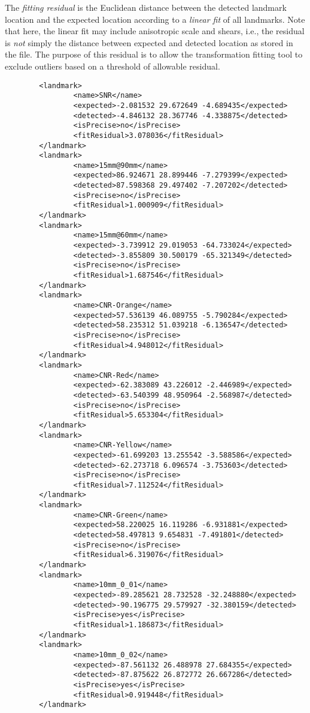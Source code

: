 \documentclass{InsightArticle}
\begin{document}
The {\em fitting residual\/} is the Euclidean distance between the detected
landmark location and the expected location according to a {\em linear fit\/}
of all landmarks. Note that here, the linear fit may include anisotropic scale
and shears, i.e., the residual is {\em not\/} simply the distance between
expected and detected location as stored in the file. The purpose of this
residual is to allow the transformation fitting tool to exclude outliers based
on a threshold of allowable residual.
\begin{verbatim}
        <landmark>
                <name>SNR</name>
                <expected>-2.081532 29.672649 -4.689435</expected>
                <detected>-4.846132 28.367746 -4.338875</detected>
                <isPrecise>no</isPrecise>
                <fitResidual>3.078036</fitResidual>
        </landmark>
        <landmark>
                <name>15mm@90mm</name>
                <expected>86.924671 28.899446 -7.279399</expected>
                <detected>87.598368 29.497402 -7.207202</detected>
                <isPrecise>no</isPrecise>
                <fitResidual>1.000909</fitResidual>
        </landmark>
        <landmark>
                <name>15mm@60mm</name>
                <expected>-3.739912 29.019053 -64.733024</expected>
                <detected>-3.855809 30.500179 -65.321349</detected>
                <isPrecise>no</isPrecise>
                <fitResidual>1.687546</fitResidual>
        </landmark>
        <landmark>
                <name>CNR-Orange</name>
                <expected>57.536139 46.089755 -5.790284</expected>
                <detected>58.235312 51.039218 -6.136547</detected>
                <isPrecise>no</isPrecise>
                <fitResidual>4.948012</fitResidual>
        </landmark>
        <landmark>
                <name>CNR-Red</name>
                <expected>-62.383089 43.226012 -2.446989</expected>
                <detected>-63.540399 48.950964 -2.568987</detected>
                <isPrecise>no</isPrecise>
                <fitResidual>5.653304</fitResidual>
        </landmark>
        <landmark>
                <name>CNR-Yellow</name>
                <expected>-61.699203 13.255542 -3.588586</expected>
                <detected>-62.273718 6.096574 -3.753603</detected>
                <isPrecise>no</isPrecise>
                <fitResidual>7.112524</fitResidual>
        </landmark>
        <landmark>
                <name>CNR-Green</name>
                <expected>58.220025 16.119286 -6.931881</expected>
                <detected>58.497813 9.654831 -7.491801</detected>
                <isPrecise>no</isPrecise>
                <fitResidual>6.319076</fitResidual>
        </landmark>
        <landmark>
                <name>10mm_0_01</name>
                <expected>-89.285621 28.732528 -32.248880</expected>
                <detected>-90.196775 29.579927 -32.380159</detected>
                <isPrecise>yes</isPrecise>
                <fitResidual>1.186873</fitResidual>
        </landmark>
        <landmark>
                <name>10mm_0_02</name>
                <expected>-87.561132 26.488978 27.684355</expected>
                <detected>-87.875622 26.872772 26.667286</detected>
                <isPrecise>yes</isPrecise>
                <fitResidual>0.919448</fitResidual>
        </landmark>


\end{verbatim}
\end{document}
